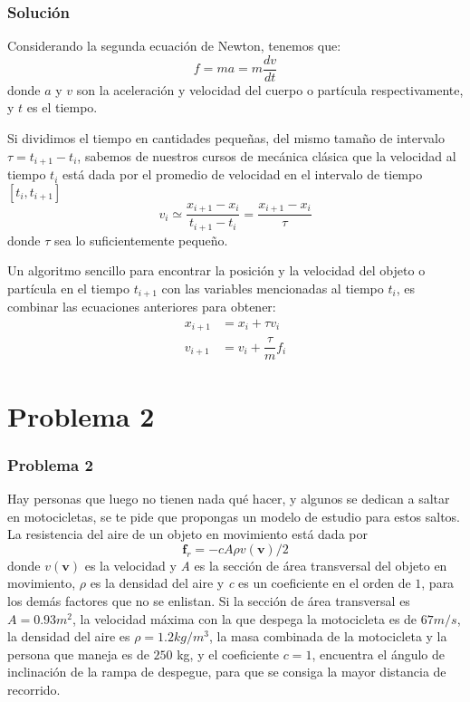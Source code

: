 \begin{frame}
\frametitle{Soluci\'{o}n}
Considerando la segunda ecuaci\'{o}n de Newton, tenemos que:
\[ f = ma = m \dfrac{dv}{dt} \]
donde $a$ y $v$ son la aceleraci\'{o}n y velocidad del cuerpo o part\'{i}cula respectivamente, y $t$ es el tiempo.
\end{frame}
\begin{frame}
Si dividimos el tiempo en cantidades pequeñas, del mismo tamaño de intervalo $\tau = t_{i+1} - t_{i}$, sabemos de nuestros cursos de mec\'{a}nica cl\'{a}sica que la velocidad al tiempo $t_{i}$ est\'{a} dada por el promedio de velocidad en el intervalo de tiempo $[t_{i},t_{i+1}]$
\[ v_{i} \simeq \dfrac{x_{i+1} -x_{i}}{t_{i+1}-t_{i}} = \dfrac{x_{i+1}-x_{i}}{\tau}\]
donde $\tau$ sea lo suficientemente pequeño.
\end{frame}
\begin{frame}
Un algoritmo sencillo para encontrar la posici\'{o}n y la velocidad del objeto o part\'{i}cula en el tiempo $t_{i+1}$ con las variables mencionadas al tiempo $t_{i}$, es combinar las ecuaciones anteriores para obtener:
\[ \begin{split}
x_{i+1} &= x_{i} + \tau v_{i} \\
v_{i+1} &= v_{i} + \dfrac{\tau}{m} f_{i}
\end{split} \]
\end{frame}
\section{Problema 2}
\begin{frame}
\frametitle{Problema 2}
Hay personas que luego no tienen nada qu\'{e} hacer, y algunos se dedican a saltar en motocicletas, se te pide que propongas un modelo de estudio para estos saltos. La resistencia del aire de un objeto en movimiento est\'{a} dada por 
\[ \textbf{f}_{r} = - cA \rho v(\textbf{v})/2 \]
donde $v(\textbf{v})$ es la velocidad y \textit{A} es la secci\'{o}n de \'{a}rea transversal del objeto en movimiento, $\rho$ es la densidad del aire y \textit{c} es un coeficiente en el orden de $1$, para los dem\'{a}s factores que no se enlistan. Si la secci\'{o}n de \'{a}rea transversal es $A=0.93m^{2}$, la velocidad m\'{a}xima con la que despega la motocicleta es de $67 m/s$, la densidad del aire es
 $\rho = 1.2 kg/m^{3}$, la masa combinada de la motocicleta y la persona que maneja es de $250$ kg, y el coeficiente $c=1$, encuentra el \'{a}ngulo de inclinaci\'{o}n de la rampa de despegue, para que se consiga la mayor distancia de recorrido.
\end{frame}
